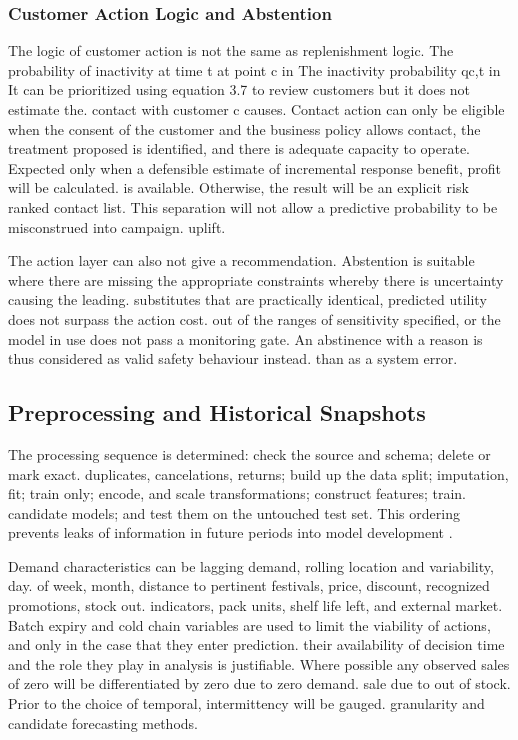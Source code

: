 \documentclass[a4paper,11pt,oneside]{book}
\theoremstyle{plain}
\theoremstyle{definition}
\theoremstyle{remark}
\begin{document}
\subsubsection{Customer Action Logic and Abstention}

The logic of customer action is not the same as replenishment logic. The probability of inactivity at time t at point c in The inactivity probability qc,t in It can be prioritized using equation 3.7 to review customers but it does not estimate the. contact with customer c causes. Contact action can only be eligible when the consent of the customer and the business policy allows contact, the treatment proposed is identified, and there is adequate capacity to operate. Expected only when a defensible estimate of incremental response benefit, profit will be calculated. is available. Otherwise, the result will be an explicit risk ranked contact list. This separation will not allow a predictive probability to be misconstrued into campaign. uplift.

The action layer can also not give a recommendation. Abstention is suitable where there are missing the appropriate constraints whereby there is uncertainty causing the leading. substitutes that are practically identical, predicted utility does not surpass the action cost. out of the ranges of sensitivity specified, or the model in use does not pass a monitoring gate. An abstinence with a reason is thus considered as valid safety behaviour instead. than as a system error.

\subsection{Preprocessing and Historical Snapshots}
\label{subsec:preprocessing_snapshots}

The processing sequence is determined: check the source and schema; delete or mark exact. duplicates, cancelations, returns; build up the data split; imputation, fit; train only; encode, and scale transformations; construct features; train. candidate models; and test them on the untouched test set. This ordering prevents leaks of information in future periods into model development \cite{kaufman2012leakage}.

Demand characteristics can be lagging demand, rolling location and variability, day. of week, month, distance to pertinent festivals, price, discount, recognized promotions, stock out. indicators, pack units, shelf life left, and external market. Batch expiry and cold chain variables are used to limit the viability of actions, and only in the case that they enter prediction. their availability of decision time and the role they play in analysis is justifiable. Where possible any observed sales of zero will be differentiated by zero due to zero demand. sale due to out of stock. Prior to the choice of temporal, intermittency will be gauged. granularity and candidate forecasting methods.
\end{document}

